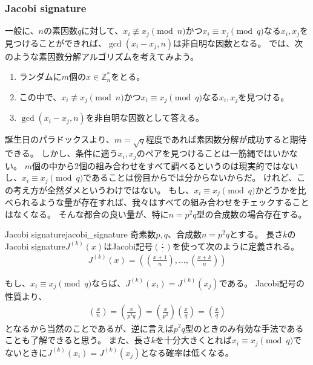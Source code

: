 \subsubsection{Jacobi signature}
一般に、$n$の素因数$q$に対して、$x_i \not\equiv x_j \pmod{n}$かつ$x_i \equiv x_j \pmod{q}$なる$x_i,x_j$を見つけることができれば、$\gcd(x_i-x_j, n)$は非自明な因数となる。
では、次のような素因数分解アルゴリズムを考えてみよう。

\begin{enumerate}
 \item ランダムに$m$個の$x\in\mathbb{Z}_n^*$をとる。
 \item この中で、$x_i \not\equiv x_j \pmod{n}$かつ$x_i \equiv x_j \pmod{q}$なる$x_i,x_j$を見つける。
 \item $\gcd(x_i-x_j, n)$を非自明な因数として答える。
\end{enumerate}

誕生日のパラドックスより、$m=\sqrt{q}$程度であれば素因数分解が成功すると期待できる。
しかし、条件に適う$x_i,x_j$のペアを見つけることは一筋縄ではいかない。
$m$個の中から2個の組み合わせをすべて調べるというのは現実的ではないし、$x_i \equiv x_j \pmod{q}$であることは傍目からでは分からないからだ。
けれど、この考え方が全然ダメというわけではない。
もし、$x_i \equiv x_j \pmod{q}$かどうかを比べられるような量が存在すれば、我々はすべての組み合わせをチェックすることはなくなる。
そんな都合の良い量が、特に$n=p^2q$型の合成数の場合存在する。

\begin{Defi}{Jacobi signature\cite{PeraltaOkamoto1996}}{jacobi_signature}
奇素数$p,q$、合成数$n=p^2q$とする。
長さ$k$のJacobi signature$J^{(k)}(x)$はJacobi記号$\left(\frac{\cdot}{\cdot} \right)$を使って次のように定義される。
\begin{align*}
J^{(k)}(x) = \left( \left(\frac{x + 1}{n} \right), \ldots, \left(\frac{x + k}{n} \right) \right)
\end{align*}
\end{Defi}

もし、$x_i \equiv x_j \pmod{q}$ならば、$J^{(k)}(x_i)=J^{(k)}(x_j)$である。
Jacobi記号の性質より、
\begin{align*}
\left(\frac{x}{n} \right) = \left(\frac{x}{p^2q} \right) = \left(\frac{x}{p^2} \right)\left(\frac{x}{q} \right) = \left(\frac{x}{q} \right)
\end{align*}
となるから当然のことであるが、逆に言えば$p^2q$型のときのみ有効な手法であることも了解できると思う。
また、長さ$k$を十分大きくとれば$x_i \equiv x_j \pmod{q}$でないときに$J^{(k)}(x_i)=J^{(k)}(x_j)$となる確率は低くなる。


